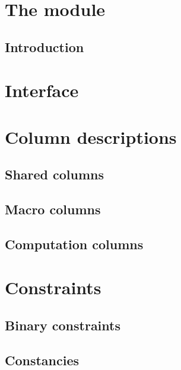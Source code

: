 
\section{The \rlpUtilsMod{} module}
\subsection{Introduction}                    \label{rlp utils: introduction}                          

\section{Interface}			                   \label{rlp utils: rlp* / rlp utils interface}          

\section{Column descriptions}                \label{rlp utils: column descriptions}                   
\subsection{Shared columns}                                                                           
\subsection{Macro columns}                                                                            
\subsection{Computation columns}                                                                      

\section{Constraints}                        \label{rlp utils: constraints}
\subsection{Binary constraints}              \label{rlp utils: constraints: binarities}               
\subsection{Constancies}                     \label{rlp utils: constraints: constancies}              
